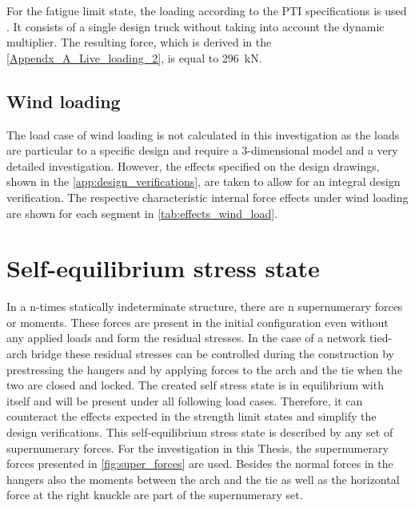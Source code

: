 

For the fatigue limit state, the loading according to the PTI specifications is used \cite{PTI}. It consists of a single design truck without taking into account the dynamic multiplier. The resulting force, which is derived in the \cref{Appendx_A_Live_loading_2}, is equal to \SI{296}{kN}.



\subsection{Wind loading}
The load case of wind loading is not calculated in this investigation as the loads are particular to a specific design and require a 3-dimensional model and a very detailed investigation. However, the effects specified on the design drawings, shown in the \cref{app:design_verifications}, are taken to allow for an integral design verification. The respective characteristic internal force effects under wind loading are shown for each segment in \cref{tab:effects_wind_load}.




\newpage
\section{Self-equilibrium stress state} \label{sec:met_seq}
In a n-times statically indeterminate structure, there are n supernumerary forces or moments. These forces are present in the initial configuration even without any applied loads and form the residual stresses. In the case of a network tied-arch bridge these residual stresses can be controlled during the construction by prestressing the hangers and by applying forces to the arch and the tie when the two are closed and locked. The created self stress state is in equilibrium with itself and will be present under all following load cases. Therefore, it can counteract the effects expected in the strength limit states and simplify the design verifications. This self-equilibrium stress state is described by any set of supernumerary forces. For the investigation in this Thesis, the supernumerary forces presented in \cref{fig:super_forces} are used. Besides the normal forces in the hangers also the moments between the arch and the tie as well as the horizontal force at the right knuckle are part of the supernumerary set.

